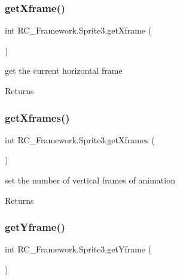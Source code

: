 \subsubsection{\texorpdfstring{get\+Xframe()}{getXframe()}}
{\footnotesize\ttfamily int R\+C\+\_\+\+Framework.\+Sprite3.\+get\+Xframe (\begin{DoxyParamCaption}{ }\end{DoxyParamCaption})}



get the current horizontal frame 

\begin{DoxyReturn}{Returns}

\end{DoxyReturn}
\mbox{\label{class_r_c___framework_1_1_sprite3_a838ca2253128f4f1099fa1ae24fe1fdf}} 
\subsubsection{\texorpdfstring{get\+Xframes()}{getXframes()}}
{\footnotesize\ttfamily int R\+C\+\_\+\+Framework.\+Sprite3.\+get\+Xframes (\begin{DoxyParamCaption}{ }\end{DoxyParamCaption})}



set the number of vertical frames of animation 

\begin{DoxyReturn}{Returns}

\end{DoxyReturn}
\mbox{\label{class_r_c___framework_1_1_sprite3_a909a64848da044a82bc9e3467ea28ace}} 
\subsubsection{\texorpdfstring{get\+Yframe()}{getYframe()}}
{\footnotesize\ttfamily int R\+C\+\_\+\+Framework.\+Sprite3.\+get\+Yframe (\begin{DoxyParamCaption}{ }\end{DoxyParamCaption})}



